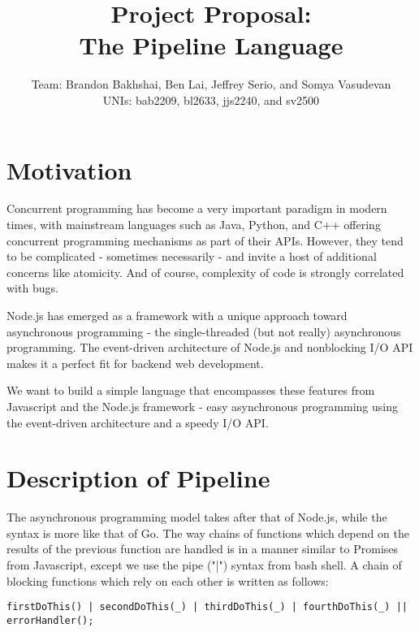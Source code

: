 \documentclass[11pt]{article}
\title{\textbf{Project Proposal:\\ The Pipeline Language}}
\author{Team: Brandon Bakhshai, Ben Lai, Jeffrey Serio, and Somya Vasudevan \\ UNIs: bab2209, bl2633, jjs2240, and sv2500}
\begin{document}
\maketitle
\thispagestyle{empty}
\renewcommand{\thesubsubsection}{\thesubsection.\alph{subsubsection}.}


\section{Motivation}
\hspace{0.5cm} Concurrent programming has become a very important paradigm in modern times, with mainstream languages such as Java, Python, and C++ offering concurrent programming mechanisms as part of their APIs. However, they tend to be complicated - sometimes necessarily - and invite a host of additional concerns like atomicity. And of course, complexity of code is strongly correlated with bugs.

Node.js has emerged as a framework with a unique approach toward asynchronous programming - the single-threaded (but not really) asynchronous programming. The event-driven architecture of Node.js and nonblocking I/O API makes it a perfect fit for backend web development.

We want to build a simple language that encompasses these features from Javascript and the Node.js framework - easy asynchronous programming using the event-driven architecture and a speedy I/O API.

\section{Description of Pipeline}

\hspace{0.5cm} The asynchronous programming model takes after that of Node.js, while the syntax is more like that of Go. The way chains of functions which depend on the results of the previous function are handled is in a manner similar to Promises from Javascript, except we use the pipe ("|") syntax from bash shell. A chain of blocking functions which rely on each other is written as follows:

\begin{lstlisting}
firstDoThis() | secondDoThis(_) | thirdDoThis(_) | fourthDoThis(_) || errorHandler();
\end{lstlisting}
\end{document}
